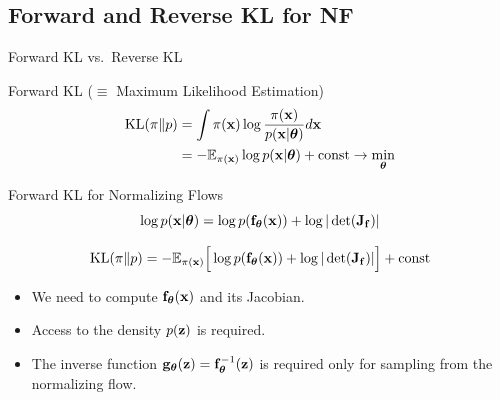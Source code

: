 \documentclass{beamer}
\begin{document}
\subsection{Forward and Reverse KL for NF}
\begin{frame}{Forward KL vs.\ Reverse KL}
	\begin{block}{Forward KL ($\equiv$ Maximum Likelihood Estimation)}
		\vspace{-0.5cm}
		\begin{align*}
			\mathrm{KL}(\pi \| p) &= \int \pi (\mathbf{x}) \log \frac{\pi(\mathbf{x})}{p(\mathbf{x} | \boldsymbol{\theta})} d \mathbf{x} \\
			&= - \mathbb{E}_{\pi(\mathbf{x})} \log p(\mathbf{x} | \boldsymbol{\theta}) + \text{const} \rightarrow \min_{\boldsymbol{\theta}}
		\end{align*}
	\end{block}
    
	\vspace{-0.5cm}
	\begin{block}{Forward KL for Normalizing Flows}
	    \vspace{-0.1cm}
		\[
			\log p(\mathbf{x}|\boldsymbol{\theta}) = \log p(\mathbf{f}_{\boldsymbol{\theta}}(\mathbf{x})) + \log  |\det (\mathbf{J}_{\mathbf{f}})|
		\]
		
		\[
			\mathrm{KL}(\pi \| p)  = - \mathbb{E}_{\pi(\mathbf{x})} \Big[\log p(\mathbf{f}_{\boldsymbol{\theta}}(\mathbf{x})) + \log  |\det (\mathbf{J}_{\mathbf{f}})|\Big] + \text{const} 
		\]
		\vspace{-0.2cm}
		
		\begin{itemize}
			\item We need to compute $\mathbf{f}_{\boldsymbol{\theta}}(\mathbf{x})$ and its Jacobian.
			\item Access to the density $p(\mathbf{z})$ is required.
			\item The inverse function $\mathbf{g}_{\boldsymbol{\theta}}(\mathbf{z}) = \mathbf{f}^{-1}_{\boldsymbol{\theta}}(\mathbf{z})$ is required only for sampling from the normalizing flow.
		\end{itemize}
	\end{block}
\end{frame}
\end{document}
